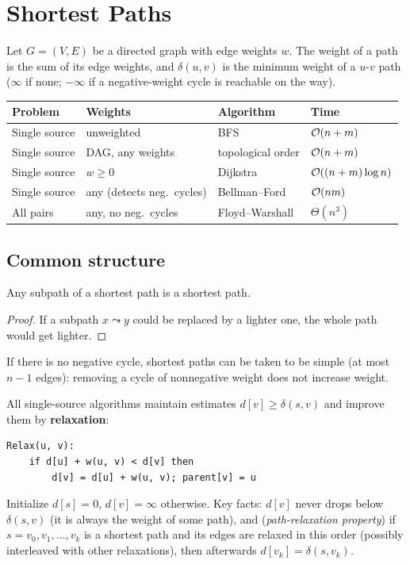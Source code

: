 \chapter{Shortest Paths}


Let $G=(V,E)$ be a directed graph with edge weights $w$. The weight of a path is the sum of its edge weights, and
$\delta(u,v)$ is the minimum weight of a $u$-$v$ path ($\infty$ if none; $-\infty$ if a negative-weight cycle is reachable on the way).

\begin{center}
\begin{tabular}{llll}
\toprule
Problem & Weights & Algorithm & Time \\
\midrule
Single source & unweighted & BFS & $\mathcal{O}(n+m)$ \\
Single source & DAG, any weights & topological order & $\mathcal{O}(n+m)$ \\
Single source & $w\ge0$ & Dijkstra & $\mathcal{O}((n+m)\log n)$ \\
Single source & any (detects neg.\ cycles) & Bellman--Ford & $\mathcal{O}(nm)$ \\
All pairs & any, no neg.\ cycles & Floyd--Warshall & $\Theta(n^3)$ \\
\bottomrule
\end{tabular}
\end{center}

\section{Common structure}
\begin{lemma}
Any subpath of a shortest path is a shortest path.
\end{lemma}
\begin{proof}
If a subpath $x\leadsto y$ could be replaced by a lighter one, the whole path would get lighter.
\end{proof}
If there is no negative cycle, shortest paths can be taken to be simple (at most $n-1$ edges): removing a cycle of nonnegative weight does not increase weight.

All single-source algorithms maintain estimates $d[v]\ge\delta(s,v)$ and improve them by \textbf{relaxation}:
\begin{lstlisting}[style=pseudo]
Relax(u, v):
    if d[u] + w(u, v) < d[v] then
        d[v] = d[u] + w(u, v); parent[v] = u
\end{lstlisting}
Initialize $d[s]=0$, $d[v]=\infty$ otherwise. Key facts: $d[v]$ never drops below $\delta(s,v)$ (it is always the weight of some path), and
(\emph{path-relaxation property}) if $s=v_0,v_1,\dots,v_k$ is a shortest path and its edges are relaxed in this order (possibly interleaved with other relaxations),
then afterwards $d[v_k]=\delta(s,v_k)$.

